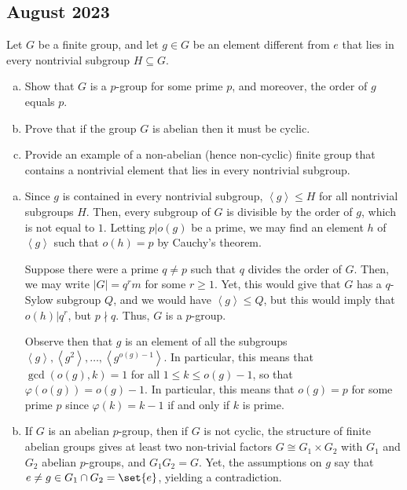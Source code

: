 \documentclass[10pt]{mypackage}
\begin{document}
\subsection{August 2023}%
\begin{problem}[Problem 1]
  Let $G$ be a finite group, and let $g\in G$ be an element different from $e$ that lies in every nontrivial subgroup $H\subseteq G$.
  \begin{enumerate}[(a)]
    \item Show that $G$ is a $p$-group for some prime $p$, and moreover, the order of $g$ equals $p$.
    \item Prove that if the group $G$ is abelian then it must be cyclic.
    \item Provide an example of a non-abelian (hence non-cyclic) finite group that contains a nontrivial element that lies in every nontrivial subgroup.
  \end{enumerate}
\end{problem}
\begin{solution}\hfill
  \begin{enumerate}[(a)]
    \item Since $g$ is contained in every nontrivial subgroup, $ \left\langle g \right\rangle\leq H $ for all nontrivial subgroups $H$. Then, every subgroup of $G$ is divisible by the order of $ g $, which is not equal to $1$. Letting $p | o(g)$ be a prime, we may find an element $h$ of $ \left\langle g \right\rangle $ such that $o(h) = p$ by Cauchy's theorem.

      Suppose there were a prime $q\neq p$ such that $q$ divides the order of $ G $. Then, we may write $ \left\vert G \right\vert = q^{r}m $ for some $r \geq 1$. Yet, this would give that $G$ has a $q$-Sylow subgroup $Q$, and we would have $ \left\langle g \right\rangle\leq Q $, but this would imply that $o(h) | q^{r}$, but $p \nmid q$. Thus, $G$ is a $p$-group.

      Observe then that $g$ is an element of all the subgroups $ \left\langle g \right\rangle,\left\langle g^2 \right\rangle,\dots,\left\langle g^{o(g)-1} \right\rangle $. In particular, this means that $\gcd\left( o(g),k \right) = 1$ for all $1\leq k \leq o(g)-1$, so that $\varphi\left( o(g) \right) = o(g)-1$. In particular, this means that $o(g) = p$ for some prime $p$ since $\varphi(k) = k-1$ if and only if $k$ is prime.
    \item If $G$ is an abelian $p$-group, then if $G$ is not cyclic, the structure of finite abelian groups gives at least two non-trivial factors $G\cong G_1\times G_2$ with $G_1$ and $G_2$ abelian $p$-groups, and $G_1G_2 = G$. Yet, the assumptions on $g$ say that $e\neq g\in G_1\cap G_2 = \set{e}$, yielding a contradiction.
  \end{enumerate}
\end{solution}
\end{document}
